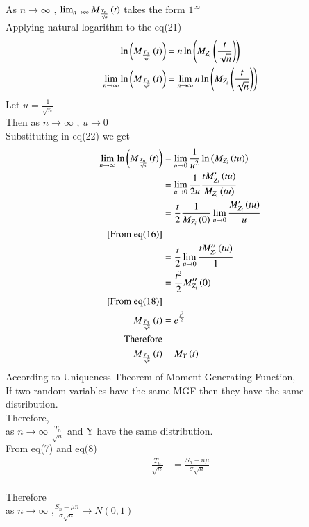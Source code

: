 \documentclass[journal,12pt,twocolumn]{IEEEtran}
\begin{document}
As $n \to \infty $ , $\lim_{n \to \infty} M_{\frac{T_n}{\sqrt{n}}}\left(t\right)$ takes the form $1^\infty$
\\Applying natural logarithm to the eq(21)
 \begin{align}
    \ln\left(M_{\frac{T_n}{\sqrt{n}}}\left(t\right)\right)&=n\ln\left(M_{Z_i}\left(\frac{t}{\sqrt{n}}\right)\right)\nonumber\\
    \lim_{n \to \infty}\ln\left(M_{\frac{T_n}{\sqrt{n}}}\left(t\right)\right)&=\lim_{n \to \infty}n\ln\left(M_{Z_i}\left(\frac{t}{\sqrt{n}}\right)\right)
    \end{align}
Let $u=\frac{1}{\sqrt{n}}$
\\Then as $n \to \infty $ , $u \to 0 $ 
\\Substituting in eq(22) we get
\begin{align}
    \lim_{n \to \infty}\ln\left(M_{\frac{T_n}{\sqrt{n}}}\left(t\right)\right)&=\lim_{u \to 0}\frac{1}{u^2}\ln\left(M_{Z_i}\left(tu\right)\right)\nonumber\\
    &=\lim_{u \to 0}\frac{1}{2u}\frac{tM_{Z_i}'\left(tu\right)}{M_{Z_i}\left(tu\right)}\nonumber\\
    &=\frac{t}{2}\frac{1}{M_{Z_i}\left(0\right)}\lim_{u \to 0}\frac{M_{Z_i}'\left(tu\right)}{u}\nonumber\\
    \text{[From eq(16)]}\nonumber\\
    &=\frac{t}{2}\lim_{u \to 0}\frac{tM_{Z_i}''\left(tu\right)}{1} \nonumber\\
    &=\frac{t^2}{2}M_{Z_i}''\left(0\right)\nonumber\\
    \text{[From eq(18)]}\nonumber\\
    M_{\frac{T_n}{\sqrt{n}}}\left(t\right)&=e^{\frac{t^2}{2}} \\
    \text{Therefore}\nonumber\\
    M_{\frac{T_n}{\sqrt{n}}}\left(t\right)&=M_Y\left(t\right)
    \end{align}
According to Uniqueness Theorem of Moment Generating Function,
\\If two random variables have the same MGF then they have the same distribution.
\\Therefore,
\\as $n \to \infty$ $\frac{T_n}{\sqrt{n}}$ and Y have the same distribution.
\\From eq(7) and eq(8)
 \begin{align}
    \frac{T_n}{\sqrt{n}}&= \frac{S_n-n\mu}{\sigma{\sqrt{n}}}
    \end{align}
\\Therefore
\\ as $n \to \infty$ ,$\frac{S_n -\mu{n}}{\sigma{\sqrt{n}}} \to N(0,1)$
\end{document}
